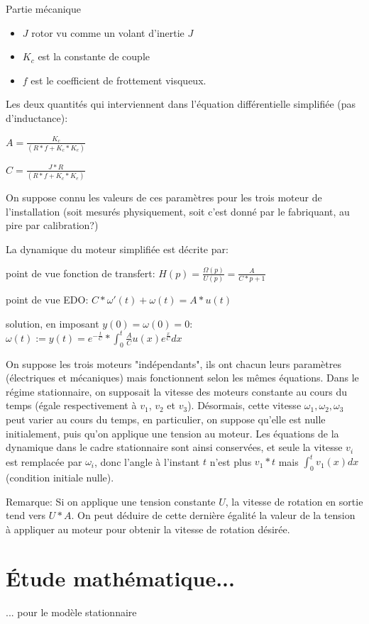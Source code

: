 \documentclass[11pt,a4paper]{article}
\begin{document}
Partie mécanique
\begin{itemize}
\item $J$  rotor vu comme un volant d'inertie $J$  
\item $K_c$ est la constante de couple  
\item $f$ est le coefficient de frottement visqueux.
\end{itemize}


Les deux quantités qui interviennent dans l'équation différentielle simplifiée (pas d'inductance):

$A =  \frac{K_c}{(R*f+K_c*K_e)}$

$C = \frac{J*R}{(R*f+K_c*K_e)}$


On suppose connu les valeurs de ces paramètres pour les trois moteur de l'installation (soit mesurés physiquement, soit c'est donné par le fabriquant, au pire par calibration?)

La dynamique du moteur simplifiée est décrite par:

point de vue fonction de transfert:
$ H(p) = \frac{\Omega(p)}{U(p)} = \frac{A}{C*p+1}$

point de vue EDO:
$C * \omega'(t) + \omega(t) = A*u(t)$


solution, en imposant $y(0) = \omega(0) = 0$: $\omega(t) := y(t) = e^{-\frac{t}{C}} * \int_0^t \frac{A}{C} u(x) e^{\frac{x}{C}} dx $


On suppose les trois moteurs "indépendants", ils ont chacun leurs paramètres (électriques et mécaniques) mais fonctionnent selon les mêmes équations.
Dans le régime stationnaire, on supposait la vitesse des moteurs constante au cours du temps (égale  respectivement à $v_1$, $v_2$ et $v_3$). Désormais, cette vitesse $\omega_1, \omega_2, \omega_3$ peut varier au cours du temps, en particulier, on suppose qu'elle est nulle initialement, puis qu'on applique une tension au moteur. Les équations de la dynamique dans le cadre stationnaire sont ainsi conservées, et seule la vitesse $v_i$ est remplacée par $\omega_i$, donc l'angle à l'instant $t$ n'est plus $v_1 *t$ mais $ \int_0^t v_1(x)dx$ (condition initiale nulle).

Remarque: Si on applique une tension constante $U$, la vitesse de rotation en sortie tend vers $U*A$. On peut déduire de cette dernière égalité la valeur de la tension à appliquer au moteur pour obtenir la vitesse de rotation désirée.




\section{Étude mathématique...}
... pour le modèle stationnaire
\end{document}
